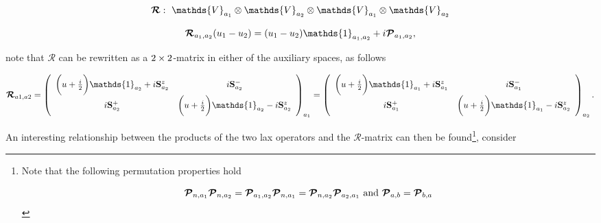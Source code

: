 \documentclass{homework}
\begin{document}
\begin{equation}
\begin{array}{c}
     \bm{\mathcal{R}}: \blanky \mathds{V}_{a_1} \otimes \mathds{V}_{a_2} \otimes \mathds{V}_{a_1} \otimes \mathds{V}_{a_2} \\ 
     \\
     \bm{\mathcal{R}}_{a_1, a_2}(u_1-u_2) = (u_1-u_2) \mathds{1}_{a_1, a_2} + i \bm{\mathcal{P}}_{a_1, a_2}, \\
     \label{R-matrix def}
\end{array}
\end{equation}

note that $\bm{\mathcal{R}}$ can be rewritten as a $2 \times 2$-matrix in either of the auxiliary spaces, as follows

\begin{equation}
    \bm{\mathcal{R}}_{a1, a2} = \left(\begin{array}{cc}
        \bigg(u + \frac{i}{2}\bigg) \mathds{1}_{a_2} + i \spin_{a_2}^z & i \spin_{a_2}^{-} \\
        i \spin_{a_2}^{+}  & \bigg(u + \frac{i}{2}\bigg) \mathds{1}_{a_2} - i \spin_{a_2}^z 
    \end{array} \right)_{a_1} = \left(\begin{array}{cc}
        \bigg(u + \frac{i}{2}\bigg) \mathds{1}_{a_1} + i \spin_{a_1}^z & i \spin_{a_1}^{-} \\
        i \spin_{a_1}^{+}  & \bigg(u + \frac{i}{2}\bigg) \mathds{1}_{a_1} - i \spin_{a_2}^z 
    \end{array} \right)_{a_2}.
\end{equation}

An interesting relationship between the products of the two lax operators and the $\bm{\mathcal{R}}$-matrix can then be found\footnote{Note that the following permutation properties hold 

\begin{equation}
\bm{\mathcal{P}}_{n, a_1}\bm{\mathcal{P}}_{n, a_2} = \bm{\mathcal{P}}_{a_1, a_2}\bm{\mathcal{P}}_{n, a_1} = \bm{\mathcal{P}}_{n, a_2}\bm{\mathcal{P}}_{a_2, a_1} \textnormal{ and } \bm{\mathcal{P}}_{a, b} = \bm{\mathcal{P}}_{b, a}
\end{equation}

}, consider 
\end{document}
